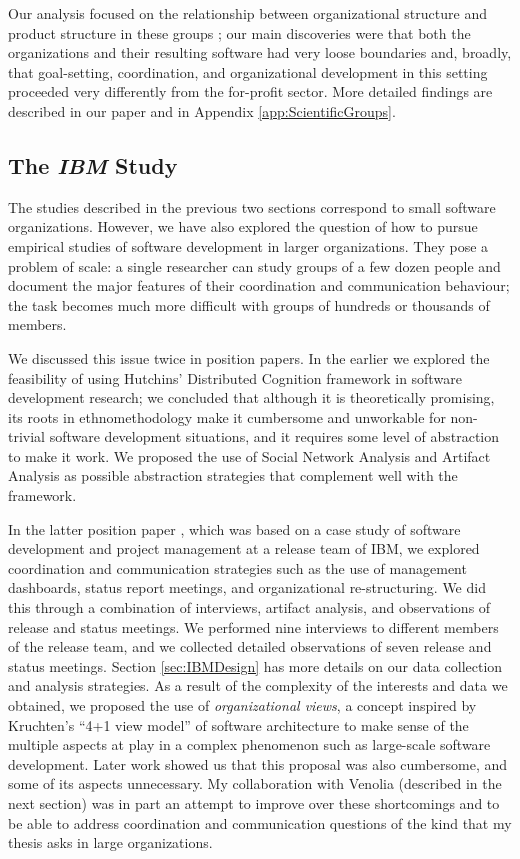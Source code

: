 Our analysis focused on the relationship between organizational structure and product structure in these groups \cite{Conway1968}; our main discoveries were that both the organizations and their resulting software had very loose boundaries and, broadly, that goal-setting, coordination, and organizational development in this setting proceeded very differently from the for-profit sector. More detailed findings are described in our paper \cite{Aranda2008b} and in Appendix \ref{app:ScientificGroups}.


\subsection{The \emph{IBM} Study}
\label{sec:IBM}

The studies described in the previous two sections correspond to small software organizations. However, we have also explored the question of how to pursue empirical studies of software development in larger organizations. They pose a problem of scale: a single researcher can study groups of a few dozen people and document the major features of their coordination and communication behaviour; the task becomes much more difficult with groups of hundreds or thousands of members.

We discussed this issue twice in position papers. In the earlier \cite{Aranda2006} we explored the feasibility of using Hutchins' Distributed Cognition framework \cite{Hutchins1995} in software development research; we concluded that although it is theoretically promising, its roots in ethnomethodology make it cumbersome and unworkable for non-trivial software development situations, and it requires some level of abstraction to make it work. We proposed the use of Social Network Analysis and Artifact Analysis as possible abstraction strategies that complement well with the framework.

In the latter position paper \cite{Aranda2007b}, which was based on a case study of software development and project management at a release team of IBM, we explored coordination and communication strategies such as the use of management dashboards, status report meetings, and organizational re-structuring. We did this through a combination of interviews, artifact analysis, and observations of release and status meetings. We performed nine interviews to different members of the release team, and we collected detailed observations of seven release and status meetings. Section \ref{sec:IBMDesign} has more details on our data collection and analysis strategies. As a result of the complexity of the interests and data we obtained, we proposed the use of \emph{organizational views}, a concept inspired by Kruchten's  ``4+1 view model'' of software architecture to make sense of the multiple aspects at play in a complex phenomenon such as large-scale software development. Later work showed us that this proposal was also cumbersome, and some of its aspects unnecessary. My collaboration with Venolia (described in the next section) was in part an attempt to improve over these shortcomings and to be able to address coordination and communication questions of the kind that my thesis asks in large organizations.

